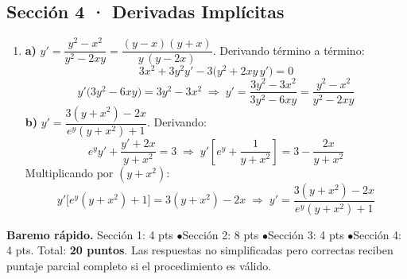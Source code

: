 \documentclass[12pt, letterpaper]{article}
\begin{document}
  \subsection*{Sección 4 · Derivadas Implícitas}

  \begin{enumerate}[leftmargin=*, label=\textbf{\arabic*.}]
    \item
    \textbf{a)} $y' = \dfrac{y^{2}-x^{2}}{y^{2}-2xy} = \dfrac{(y-x)(y+x)}{y\,(y-2x)}$. Derivando término a término:
    \[
      3x^{2} + 3y^{2}y' - 3\big(y^{2} + 2xy\,y'\big) = 0
    \]
    \[
      y'\big(3y^{2} - 6xy\big) = 3y^{2} - 3x^{2}
      \;\Longrightarrow\;
      y' = \frac{3y^{2}-3x^{2}}{3y^{2}-6xy} = \frac{y^{2}-x^{2}}{y^{2}-2xy}
    \]
    \textbf{b)} $y' = \dfrac{3\left(y+x^{2}\right) - 2x}{e^{y}\left(y+x^{2}\right) + 1}$. Derivando:
    \[
      e^{y}y' + \frac{y' + 2x}{y+x^{2}} = 3
      \;\Longrightarrow\;
      y'\left[e^{y} + \frac{1}{y+x^{2}}\right] = 3 - \frac{2x}{y+x^{2}}
    \]
    Multiplicando por $\left(y+x^{2}\right)$:
    \[
      y'\Big[e^{y}\left(y+x^{2}\right) + 1\Big] = 3\left(y+x^{2}\right) - 2x
      \;\Longrightarrow\;
      y' = \frac{3\left(y+x^{2}\right) - 2x}{e^{y}\left(y+x^{2}\right) + 1}
    \]
  \end{enumerate}

  \vspace{10pt}
  \begin{cuadrosolucion}
    \textbf{Baremo rápido.} Sección 1: 4 pts \quad$\bullet$\quad Sección 2: 8 pts \quad$\bullet$\quad Sección 3: 4 pts \quad$\bullet$\quad Sección 4: 4 pts. Total: \textbf{20 puntos}. Las respuestas no simplificadas pero correctas reciben puntaje parcial completo si el procedimiento es válido.
  \end{cuadrosolucion}
\fi
\end{document}
